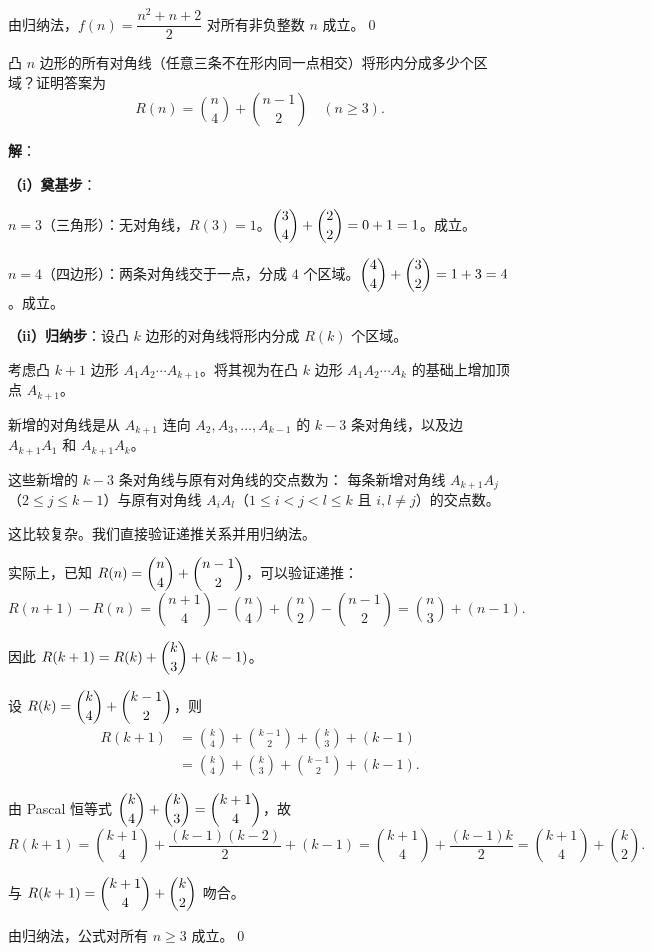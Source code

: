 \documentclass[12pt, a4paper]{ctexart}
\begin{document}
由归纳法，$f(n) = \dfrac{n^2 + n + 2}{2}$ 对所有非负整数 $n$ 成立。\qed

\begin{appbox}[【应用2】凸多边形对角线交点]
凸 $n$ 边形的所有对角线（任意三条不在形内同一点相交）将形内分成多少个区域？证明答案为
\[ R(n) = \binom{n}{4} + \binom{n-1}{2} \quad (n \geq 3). \]
\end{appbox}

\textbf{解}：

\textbf{（i）奠基步}：

$n = 3$（三角形）：无对角线，$R(3) = 1$。$\dbinom{3}{4} + \dbinom{2}{2} = 0 + 1 = 1$。成立。

$n = 4$（四边形）：两条对角线交于一点，分成 $4$ 个区域。$\dbinom{4}{4} + \dbinom{3}{2} = 1 + 3 = 4$。成立。

\textbf{（ii）归纳步}：设凸 $k$ 边形的对角线将形内分成 $R(k)$ 个区域。

考虑凸 $k+1$ 边形 $A_1 A_2 \cdots A_{k+1}$。将其视为在凸 $k$ 边形 $A_1 A_2 \cdots A_k$ 的基础上增加顶点 $A_{k+1}$。

新增的对角线是从 $A_{k+1}$ 连向 $A_2, A_3, \ldots, A_{k-1}$ 的 $k-3$ 条对角线，以及边 $A_{k+1}A_1$ 和 $A_{k+1}A_k$。

这些新增的 $k-3$ 条对角线与原有对角线的交点数为：
每条新增对角线 $A_{k+1}A_j$（$2 \leq j \leq k-1$）与原有对角线 $A_i A_l$（$1 \leq i < j < l \leq k$ 且 $i, l \neq j$）的交点数。

这比较复杂。我们直接验证递推关系并用归纳法。

实际上，已知 $R(n) = \dbinom{n}{4} + \dbinom{n-1}{2}$，可以验证递推：
\[ R(n+1) - R(n) = \binom{n+1}{4} - \binom{n}{4} + \binom{n}{2} - \binom{n-1}{2} = \binom{n}{3} + (n-1). \]

因此 $R(k+1) = R(k) + \dbinom{k}{3} + (k-1)$。

设 $R(k) = \dbinom{k}{4} + \dbinom{k-1}{2}$，则
\begin{align*}
R(k+1) &= \binom{k}{4} + \binom{k-1}{2} + \binom{k}{3} + (k-1) \\
&= \binom{k}{4} + \binom{k}{3} + \binom{k-1}{2} + (k-1).
\end{align*}

由 Pascal 恒等式 $\dbinom{k}{4} + \dbinom{k}{3} = \dbinom{k+1}{4}$，故
\[ R(k+1) = \binom{k+1}{4} + \frac{(k-1)(k-2)}{2} + (k-1) = \binom{k+1}{4} + \frac{(k-1)k}{2} = \binom{k+1}{4} + \binom{k}{2}. \]

与 $R(k+1) = \dbinom{k+1}{4} + \dbinom{k}{2}$ 吻合。

由归纳法，公式对所有 $n \geq 3$ 成立。\qed
\end{document}
